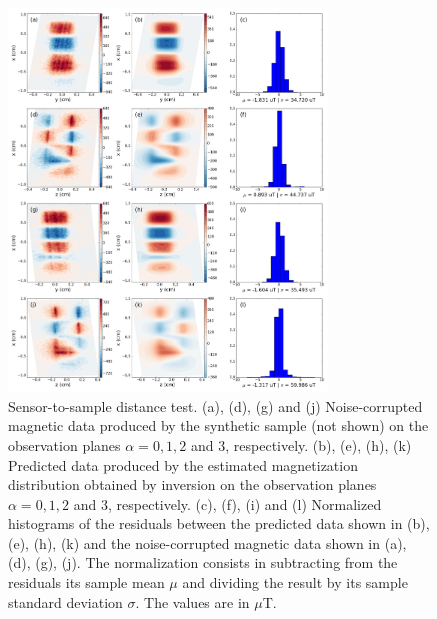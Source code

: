 \documentclass[draft,gc]{agutex}
\begin{document}
 \begin{figure}
 \noindent \includegraphics[width=20pc]{Figs/Fig9_LQ.png}
 \caption{Sensor-to-sample distance test. (a), (d), (g) and (j) Noise-corrupted
 magnetic data produced by the synthetic sample (not shown) on the
 observation planes $\alpha = 0, 1, 2$ and $3$, respectively.
 (b), (e), (h), (k) Predicted data produced by the estimated
 magnetization distribution obtained by inversion on the
 observation planes $\alpha = 0, 1, 2$ and $3$, respectively.
 (c), (f), (i) and (l) Normalized histograms of the residuals between the
 predicted data shown in (b), (e), (h), (k) and the 
 noise-corrupted magnetic data shown in (a), (d), (g), (j). 
 The normalization
 consists in subtracting from the residuals its sample mean $\mu$ 
 and dividing the result by its sample standard deviation $\sigma$.
 The values are in $\mu$T.}
 \label{fig:datafit-sensor2sample}
 \end{figure}
 
\end{document}
